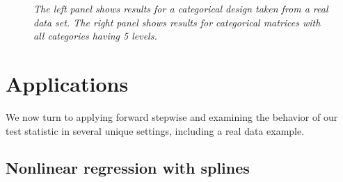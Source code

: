 \documentclass{imsart}
\begin{document}
\begin{figure}[h]
\begin{center}
\hspace{-15pt}
\caption{\small \it The left panel shows results for a categorical design
taken from a real data set.
The right panel shows results for categorical matrices with all categories having 5 levels.}
\end{center}
\end{figure}

%






\section{Applications}
\label{sec:applications}
We now turn to applying forward stepwise and examining the behavior of
our test statistic in several unique settings, including a real data
example.

\subsection{Nonlinear regression with splines}
\end{document}
